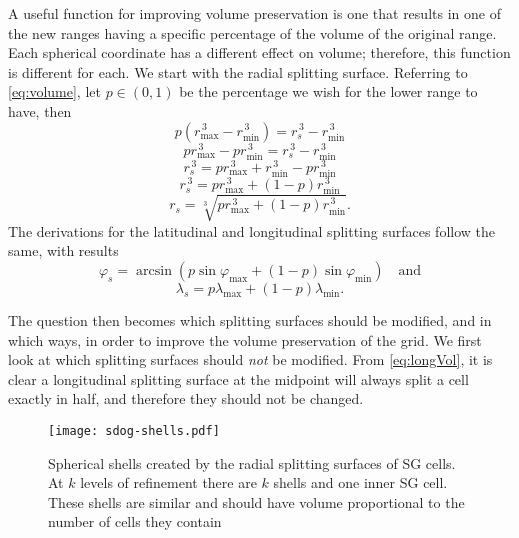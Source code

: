 A useful function for improving volume preservation is one that results in one of the new ranges having a specific percentage of the volume of the original range.
Each spherical coordinate has a different effect on volume; therefore, this function is different for each.
We start with the radial splitting surface.
Referring to \cref{eq:volume}, let $p \in (0,1)$ be the percentage we wish for the lower range to have, then
%
\begin{equation*}
p \left( r_\mathrm{max}^{\,3} - r_\mathrm{min}^{\,3} \right) = r_{s}^{\,3} - r_\mathrm{min}^{\,3}
\end{equation*}
%
\begin{equation*}
p r_\mathrm{max}^{\,3} - p r_\mathrm{min}^{\,3} = r_{s}^{\,3} - r_\mathrm{min}^{\,3}
\end{equation*}
%
\begin{equation*}
r_{s}^{\,3} = p r_\mathrm{max}^{\,3} + r_\mathrm{min}^{\,3} - p r_\mathrm{min}^{\,3}
\end{equation*}
%
\begin{equation*}
r_{s}^{\,3} = p r_\mathrm{max}^{\,3} + \left( 1 - p \right) r_\mathrm{min}^{\,3}
\end{equation*}
%
\begin{equation} \label{eq:radVol}
r_{s} = \sqrt[3]{ p r_\mathrm{max}^{\,3} + \left( 1 - p \right) r_\mathrm{min}^{\,3} }.
\end{equation}
%
The derivations for the latitudinal and longitudinal splitting surfaces follow the same, with results
%
\begin{equation} \label{eq:latVol}
\varphi_{s} = \arcsin \left( p \sin\varphi_\mathrm{max} + \left( 1 - p \right) \sin\varphi_\mathrm{min} \right) \quad\text{and}
\end{equation}
%
\begin{equation} \label{eq:longVol}
\lambda_{s} = p \lambda_\mathrm{max} + \left( 1 - p \right) \lambda_\mathrm{min}.
\end{equation}


The question then becomes which splitting surfaces should be modified, and in which ways, in order to improve the volume preservation of the grid.
We first look at which splitting surfaces should \textit{not} be modified.
From \cref{eq:longVol}, it is clear a longitudinal splitting surface at the midpoint will always split a cell exactly in half, and therefore they should not be changed.


\begin{figure}[ht!]
	\centering
	\texttt{[image: sdog-shells.pdf]}
	\caption[Spherical shells that result from SDOG refinement]{
		Spherical shells created by the radial splitting surfaces of SG cells.
		At $k$ levels of refinement there are $k$ shells and one inner SG cell.
		These shells are similar and should have volume proportional to the number of cells they contain
	}
	\label{fig:sdog-shells}
\end{figure}


